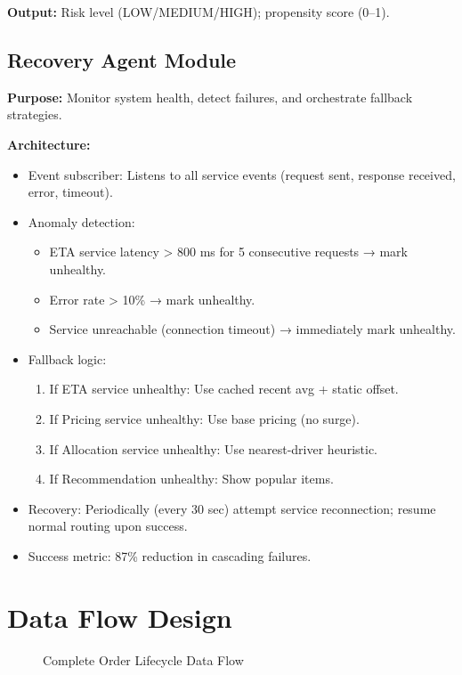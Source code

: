 \documentclass[12pt,a4paper]{report}
\begin{document}
\begin{itemize}
\textbf{Output:} Risk level (LOW/MEDIUM/HIGH); propensity score (0--1).

\subsection{Recovery Agent Module}

\textbf{Purpose:} Monitor system health, detect failures, and orchestrate fallback strategies.

\textbf{Architecture:}
\begin{itemize}
    \item Event subscriber: Listens to all service events (request sent, response received, error, timeout).
    \item Anomaly detection:
    \begin{itemize}
        \item ETA service latency > 800 ms for 5 consecutive requests → mark unhealthy.
        \item Error rate > 10\% → mark unhealthy.
        \item Service unreachable (connection timeout) → immediately mark unhealthy.
    \end{itemize}
    \item Fallback logic:
    \begin{enumerate}
        \item If ETA service unhealthy: Use cached recent avg + static offset.
        \item If Pricing service unhealthy: Use base pricing (no surge).
        \item If Allocation service unhealthy: Use nearest-driver heuristic.
        \item If Recommendation unhealthy: Show popular items.
    \end{enumerate}
    \item Recovery: Periodically (every 30 sec) attempt service reconnection; resume normal routing upon success.
    \item Success metric: 87\% reduction in cascading failures.
\end{itemize}

\section{Data Flow Design}

\begin{figure}[H]
\centering
{}
\caption{Complete Order Lifecycle Data Flow}
\end{figure}


\end{itemize}
\end{document}

